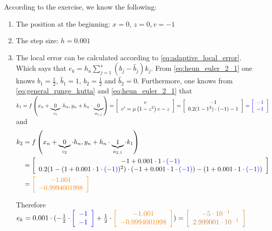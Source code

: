 According to the exercise, we know the following:
\begin{enumerate}
    \item The position at the beginning: $x=0$, $z=0, v=-1$
    \item The step size: $h=0.001$
    \item The local error can be calculated according to \autoref{eq:adaptive_local_error}. Which says that $e_{k}=h_{n} \sum_{j=1}^{s}\left(b_{j}-\hat{b}_{j}\right) k_{j}$. From \autoref{eq:heun_euler_2_1} one knows $b_1=\frac{1}{2}$, $\hat{b}_1=1$, $b_2=\frac{1}{2}$ and $\hat{b}_2=0$. Furthermore, one knows from \autoref{eq:general_runge_kutta} and \autoref{eq:heun_euler_2_1} that $k_1=f\left(x_n+\underbrace{0}_{c_1}\cdot h_n, y_n+h_n\cdot \underbrace{0}_{a_{1,j}} \right)=
    \left[\begin{array}{cc}
    v \\ 
    v^{\prime}=\mu\left(1-z^2\right) v-z
    \end{array}\right]=
    \left[\begin{array}{cc}
    -1\\
    0.2(1-1^2)\cdot (-1)-1
    \end{array}\right]=
    \textcolor{blue}{\left[\begin{array}{cc}
    -1\\
    -1
    \end{array}\right]}$ and 
    $$\begin{aligned}k_2&=f\left(x_n+\underbrace{0}_{c_2}\cdot h_n, y_n+h_n\cdot \underbrace{1}_{a_{2,1}}\cdot k_1\right)\\&=
    \left[\begin{array}{cc}
    -1+0.001\cdot 1\cdot \textcolor{blue}{(-1)} \\ 
    0.2(1-(1+0.001\cdot 1 \cdot \textcolor{blue}{(-1)})^2)\cdot (-1+ 0.001\cdot 1 \cdot \textcolor{blue}{(-1)})-(1+0.001\cdot 1 \cdot \textcolor{blue}{(-1)})
    \end{array}\right]\\&=
    \textcolor{orange}{\left[\begin{array}{cc}
    -1.001\\ 
    -0.9994001998
    \end{array}\right]}\end{aligned}$$
    
    Therefore $e_k=0.001\cdot (-\frac{1}{2}\cdot\textcolor{blue}{\left[\begin{array}{cc}
    -1\\
    -1
    \end{array}\right]} + \frac{1}{2} \cdot \textcolor{orange}{\left[\begin{array}{cc}
    -1.001\\ 
    -0.9994001998
    \end{array}\right]} )= \textcolor{brown}{\left[\begin{array}{cc}
    -5\cdot 10^{-1}\\ 
    2.999001\cdot 10^{-1}
    \end{array}\right]}$
    

\end{enumerate}
